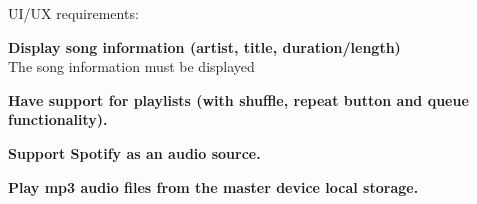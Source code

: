 UI/UX requirements:
\begin{eletterate}[resume]
    \item \textbf{Display song information (artist, title, duration/length)} \hfill\\
        The song information must be displayed 
    \item \textbf{Have support for playlists (with shuffle, repeat button and queue functionality).} \hfill\\
    \item \textbf{Support Spotify as an audio source.} \hfill\\
    \item \textbf{Play mp3 audio files from the master device local storage.} \hfill\\
\end{eletterate}
